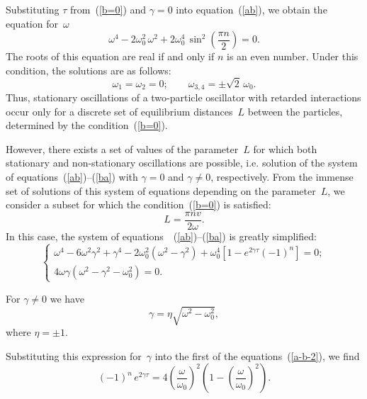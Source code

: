\documentclass[a4,%
amsmath,amssymb,
12pt
]{revtex4-1}
\begin{document}
Substituting $ \tau $ from~(\ref {b=0}) and $ \gamma = 0 $ into equation~(\ref{ab}), we obtain the equation for~$ \omega $
%
\begin{equation}\label{a-n}
\omega^4 - 2 \omega_0^2\, \omega^2 +2\omega_0^4\,\sin^2\left(\frac{\pi n}{2} \right) =0.
\end{equation}
The roots of this equation are real if and only if $ n $ is an even number. Under this condition, the solutions are as follows:
\begin{equation}\label{a1-a4}
\omega_1=\omega_2=0; \qquad \omega_{3,4}=\pm\sqrt{2}\,\omega_0.
\end{equation}
%
Thus, stationary oscillations of a two-particle oscillator with retarded interactions occur only for a discrete set of equilibrium distances~$ L $ between the particles, determined by the condition~(\ref {b=0}).

However, there exists a set of values of the parameter~$ L $ for which both stationary and non-stationary oscillations are possible, i.e. solution of the system of equations~(\ref {ab})--(\ref{ba}) with $\gamma = 0 $ and $\gamma \not = 0 $, respectively. 
From the immense set of solutions of this system of equations depending on the parameter~$ L $, we consider a subset for which the condition~(\ref {b=0}) is satisfied:
\begin{equation}\label{sin=0}
L=\frac{\pi n v}{2\omega}.
\end{equation} 
In this case, the system of equations~~(\ref {ab})--(\ref{ba}) is greatly simplified:
\begin{equation}\label{a-b-2}
\left\lbrace 
\begin{array}{l}
{\displaystyle \omega^4 - 6\omega^2\gamma^2+\gamma^4- 2 \omega_0^2\left( \omega^2 - \gamma^2\right) +\omega_0^4\left[1-e^{2\gamma\tau} \left( -1\right)^n  \right]  =0; }\\
{\displaystyle 4\omega \gamma\left(\omega^2-\gamma^2 - \omega_0^2\right) = 0.}
\end{array}
\right. 
\end{equation}

For $ \gamma \not = 0 $ we have
\begin{equation}\label{b-nonzero}
\gamma=\eta \sqrt{\omega^2 - \omega_0^2},
\end{equation}
where $\eta=\pm 1$.

Substituting this expression for~$ \gamma $ into the first of the equations~(\ref {a-b-2}), we find
\begin{equation}\label{a-2}
\left( -1\right)^n\, e^{2\gamma\tau} =   4 \left( \frac{\omega}{\omega_0}\right) ^2 \left(1 - \left( \frac{\omega}{\omega_0}\right) ^2 \right). 
\end{equation}
\end{document}
